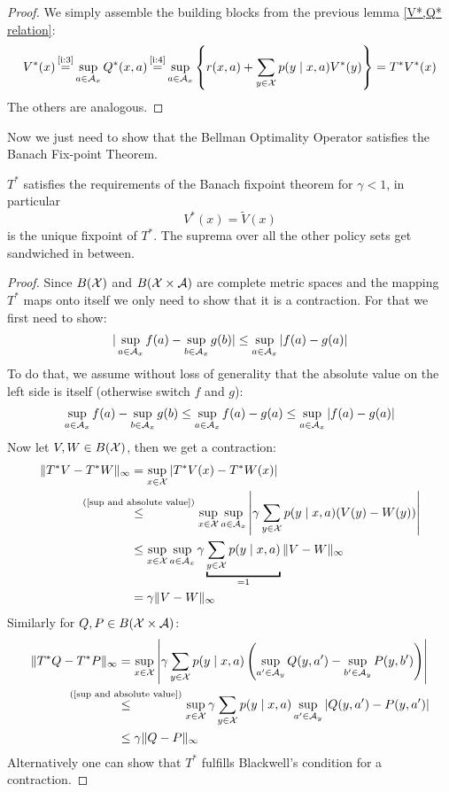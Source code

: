 \begin{proof}
	We simply assemble the building blocks from the previous lemma \ref{V*,Q* relation}:
\begin{align*}
	V^*(x)\xeq{\text{\ref{i:3}}}\sup_{a\in\cA_x}Q^*(x,a)
	\xeq{\text{\ref{i:4}}}\sup_{a\in\cA_x}\left\{r(x,a)+\sum_{y\in\cX}p(y\mid x,a) V^*(y)\right\} =T^*V^*(x)
\end{align*}
The others are analogous.
\end{proof}

Now we just need to show that the Bellman Optimality Operator satisfies the Banach Fix-point Theorem.

\begin{thm}\label{T^* satisfies BFT}
\(T^*\) satisfies the requirements of the Banach fixpoint theorem for \(\gamma<1\), in particular
	\[V^*(x)=\tilde{V}(x) \]
is the unique fixpoint of \(T^*\). The suprema over all the other policy sets get sandwiched in between.
\end{thm}
\begin{proof}
	\parencite[79]{szepesvariAlgorithmsReinforcementLearning2010} 
	Since \(B(\mathcal{X})\) and \(B(\mathcal{X}\times\mathcal{A})\) are complete metric spaces and the mapping \(T^*\) maps onto itself we only need to show that it is a contraction. For that we first need to show:
	\begin{align}\label{sup and absolute value}
		|\sup_{a\in\mathcal{A}_x} f(a) -\sup_{b\in\mathcal{A}_x}g(b)| \le \sup_{a\in\mathcal{A}_x}|f(a)-g(a)|
	\end{align}
	To do that, we assume without loss of generality that the absolute value on the left side is itself (otherwise switch \(f\) and \(g\)):
	\begin{align*}
		\sup_{a\in\mathcal{A}_x} f(a) -\sup_{b\in\mathcal{A}_x}g(b) \le \sup_{a\in\mathcal{A}_x} f(a)- g(a)\le \sup_{a\in\mathcal{A}_x}|f(a)-g(a)|
	\end{align*}
	Now let \(V, W \in B(\mathcal{X}) \), then we get a contraction:
	\begin{align*}
		\|T^*V -T^*W\|_\infty
		&=\sup_{x\in\cX} |T^*V(x) -T^*W(x)|\\
		&\lxlq{\text{(\ref{sup and absolute value})}}\sup_{x\in\cX}\sup_{a\in\cA_x}
		\left|\gamma\sum_{y\in\cX}p(y\mid x,a) (V(y) -W(y))\right|\\
		&\le \sup_{x\in\cX}\sup_{a\in\cA_x} 
		\gamma\underbracket{\sum_{y\in\cX}p(y\mid x,a)}_{=1} \|V-W\|_\infty\\
		&=\gamma \|V-W\|_\infty
	\end{align*}
	Similarly for \(Q, P\in B(\mathcal{X}\times\mathcal{A})\):
	\begin{align*}
		\|T^*Q -T^*P\|_\infty
		&=\sup_{x\in\cX} \left|\gamma \sum_{y\in\cX} p(y\mid x,a) 
		\left(\sup_{a'\in\cA_y}Q(y, a') -\sup_{b'\in\cA_y}P(y,b') \right) \right|\\
		&\lxlq{\text{(\ref{sup and absolute value})}}\sup_{x\in\cX} 
		\gamma \sum_{y\in\cX} p(y\mid x,a) \sup_{a'\in\cA_y} |Q(y, a')-P(y,a')|\\
		&\le \gamma \|Q-P\|_\infty \qedhere
	\end{align*}
	Alternatively one can show that \(T^*\) fulfills Blackwell's condition for a contraction. 
\end{proof}

